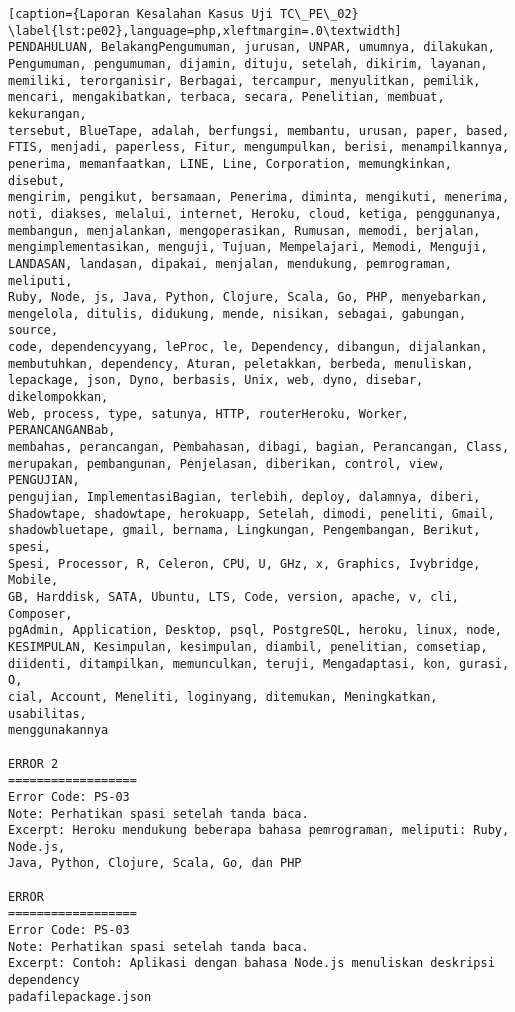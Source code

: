 \begin{enumerate}
\begin{lstlisting}[caption={Laporan Kesalahan Kasus Uji TC\_PE\_02}	\label{lst:pe02},language=php,xleftmargin=.0\textwidth]
PENDAHULUAN, BelakangPengumuman, jurusan, UNPAR, umumnya, dilakukan, 
Pengumuman, pengumuman, dijamin, dituju, setelah, dikirim, layanan, 
memiliki, terorganisir, Berbagai, tercampur, menyulitkan, pemilik, 
mencari, mengakibatkan, terbaca, secara, Penelitian, membuat, kekurangan, 
tersebut, BlueTape, adalah, berfungsi, membantu, urusan, paper, based, 
FTIS, menjadi, paperless, Fitur, mengumpulkan, berisi, menampilkannya, 
penerima, memanfaatkan, LINE, Line, Corporation, memungkinkan, disebut, 
mengirim, pengikut, bersamaan, Penerima, diminta, mengikuti, menerima, 
noti, diakses, melalui, internet, Heroku, cloud, ketiga, penggunanya, 
membangun, menjalankan, mengoperasikan, Rumusan, memodi, berjalan, 
mengimplementasikan, menguji, Tujuan, Mempelajari, Memodi, Menguji, 
LANDASAN, landasan, dipakai, menjalan, mendukung, pemrograman, meliputi, 
Ruby, Node, js, Java, Python, Clojure, Scala, Go, PHP, menyebarkan, 
mengelola, ditulis, didukung, mende, nisikan, sebagai, gabungan, source, 
code, dependencyyang, leProc, le, Dependency, dibangun, dijalankan, 
membutuhkan, dependency, Aturan, peletakkan, berbeda, menuliskan, 
lepackage, json, Dyno, berbasis, Unix, web, dyno, disebar, dikelompokkan, 
Web, process, type, satunya, HTTP, routerHeroku, Worker, PERANCANGANBab, 
membahas, perancangan, Pembahasan, dibagi, bagian, Perancangan, Class, 
merupakan, pembangunan, Penjelasan, diberikan, control, view, PENGUJIAN, 
pengujian, ImplementasiBagian, terlebih, deploy, dalamnya, diberi, 
Shadowtape, shadowtape, herokuapp, Setelah, dimodi, peneliti, Gmail, 
shadowbluetape, gmail, bernama, Lingkungan, Pengembangan, Berikut, spesi, 
Spesi, Processor, R, Celeron, CPU, U, GHz, x, Graphics, Ivybridge, Mobile, 
GB, Harddisk, SATA, Ubuntu, LTS, Code, version, apache, v, cli, Composer, 
pgAdmin, Application, Desktop, psql, PostgreSQL, heroku, linux, node, 
KESIMPULAN, Kesimpulan, kesimpulan, diambil, penelitian, comsetiap, 
diidenti, ditampilkan, memunculkan, teruji, Mengadaptasi, kon, gurasi, O, 
cial, Account, Meneliti, loginyang, ditemukan, Meningkatkan, usabilitas, 
menggunakannya

ERROR 2
==================
Error Code: PS-03
Note: Perhatikan spasi setelah tanda baca.
Excerpt: Heroku mendukung beberapa bahasa pemrograman, meliputi: Ruby, Node.js, 
Java, Python, Clojure, Scala, Go, dan PHP

ERROR 
==================
Error Code: PS-03
Note: Perhatikan spasi setelah tanda baca.
Excerpt: Contoh: Aplikasi dengan bahasa Node.js menuliskan deskripsi dependency 
padafilepackage.json 


\end{lstlisting}
\end{enumerate}
